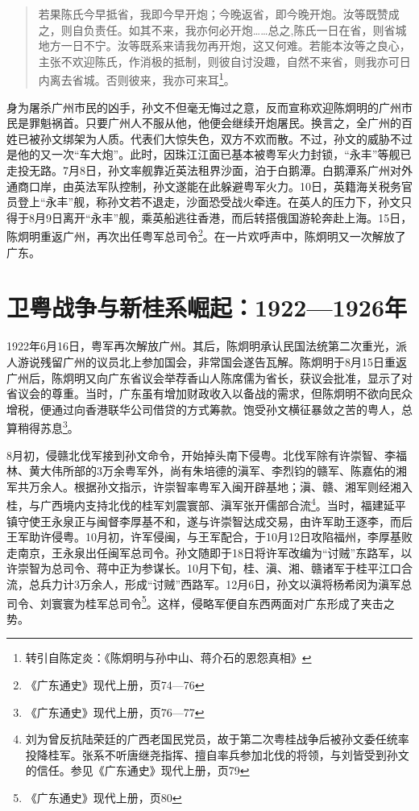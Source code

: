 \begin{quote}
若果陈氏今早抵省，我即今早开炮；今晚返省，即今晚开炮。汝等既赞成之，则自负责任。如其不来，我亦何必开炮……总之,陈氏一日在省，则省城地方一日不宁。汝等既系来请我勿再开炮，这又何难。若能本汝等之良心，主张不欢迎陈氏，作消极的抵制，则彼自讨没趣，自然不来省，则我亦可日内离去省城。否则彼来，我亦可来耳\footnote{转引自陈定炎：《陈炯明与孙中山、蒋介石的恩怨真相》}。

\end{quote}

身为屠杀广州市民的凶手，孙文不但毫无悔过之意，反而宣称欢迎陈炯明的广州市民是罪魁祸首。只要广州人不服从他，他便会继续开炮屠民。换言之，全广州的百姓已被孙文绑架为人质。代表们大惊失色，双方不欢而散。不过，孙文的威胁不过是他的又一次“车大炮”。此时，因珠江江面已基本被粤军火力封锁，“永丰”等舰已走投无路。7月8日，孙文率舰靠近英法租界沙面，泊于白鹅潭。白鹅潭系广州对外通商口岸，由英法军队控制，孙文遂能在此躲避粤军火力。10日，英籍海关税务官员登上“永丰”舰，称孙文若不退走，沙面恐受战火牵连。在英人的压力下，孙文只得于8月9日离开“永丰”舰，乘英船逃往香港，而后转搭俄国游轮奔赴上海。15日，陈炯明重返广州，再次出任粤军总司令\footnote{《广东通史》现代上册，页74—76}。在一片欢呼声中，陈炯明又一次解放了广东。

\section{卫粤战争与新桂系崛起：1922—1926年}

\indent 1922年6月16日，粤军再次解放广州。其后，陈炯明承认民国法统第二次重光，派人游说残留广州的议员北上参加国会，非常国会遂告瓦解。陈炯明于8月15日重返广州后，陈炯明又向广东省议会举荐香山人陈席儒为省长，获议会批准，显示了对省议会的尊重。当时，广东虽有增加财政收入以备战的需求，但陈炯明不欲向民众增税，便通过向香港联华公司借贷的方式筹款。饱受孙文横征暴敛之苦的粤人，总算稍得苏息\footnote{《广东通史》现代上册，页76—77}。

8月初，侵赣北伐军接到孙文命令，开始掉头南下侵粤。北伐军除有许崇智、李福林、黄大伟所部的3万余粤军外，尚有朱培德的滇军、李烈钧的赣军、陈嘉佑的湘军共万余人。根据孙文指示，许崇智率粤军入闽开辟基地；滇、赣、湘军则经湘入桂，与广西境内支持北伐的桂军刘震寰部、滇军张开儒部合流\footnote{刘为曾反抗陆荣廷的广西老国民党员，故于第二次粤桂战争后被孙文委任统率投降桂军。张系不听唐继尧指挥、擅自率兵参加北伐的将领，与刘皆受到孙文的信任。参见《广东通史》现代上册，页79}。当时，福建延平镇守使王永泉正与闽督李厚基不和，遂与许崇智达成交易，由许军助王逐李，而后王军助许侵粤。10月初，许军侵闽，与王军配合，于10月12日攻陷福州，李厚基败走南京，王永泉出任闽军总司令。孙文随即于18日将许军改编为“讨贼”东路军，以许崇智为总司令、蒋中正为参谋长。10月下旬，桂、滇、湘、赣诸军于桂平江口合流，总兵力计3万余人，形成“讨贼”西路军。12月6日，孙文以滇将杨希闵为滇军总司令、刘寰寰为桂军总司令\footnote{《广东通史》现代上册，页80}。这样，侵略军便自东西两面对广东形成了夹击之势。

